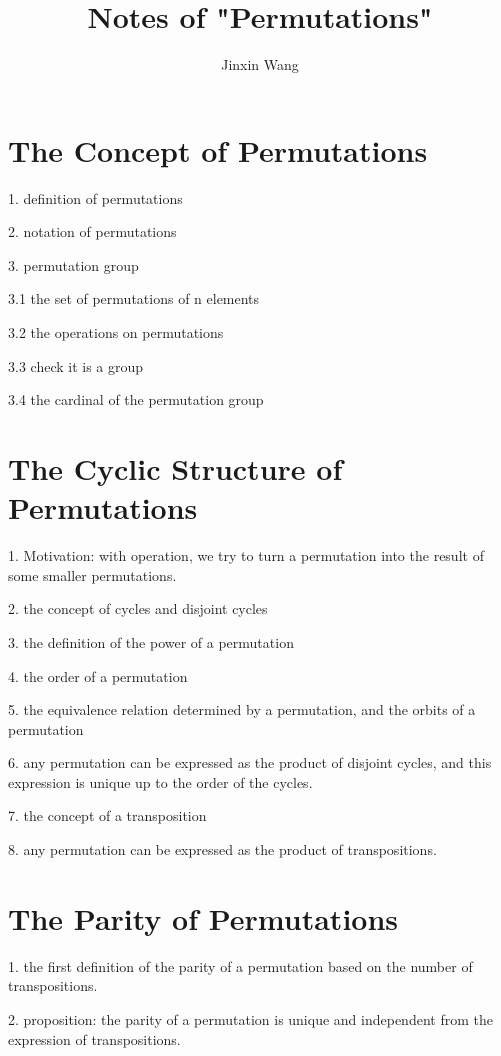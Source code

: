 \documentclass[onecolumn]{ctexart}
\title{Notes of "Permutations"}
\author{Jinxin Wang}
\date{}
\begin{document}
\maketitle

\section{The Concept of Permutations}

1. definition of permutations

2. notation of permutations

3. permutation group

3.1 the set of permutations of n elements

3.2 the operations on permutations

3.3 check it is a group

3.4 the cardinal of the permutation group

\section{The Cyclic Structure of Permutations}

1. Motivation: with operation, we try to turn a permutation into the result of 
some smaller permutations.

2. the concept of cycles and disjoint cycles

3. the definition of the power of a permutation

4. the order of a permutation

5. the equivalence relation determined by a permutation, and the orbits of a 
permutation

6. any permutation can be expressed as the product of disjoint cycles, and this 
expression is unique up to the order of the cycles.

7. the concept of a transposition

8. any permutation can be expressed as the product of transpositions.

\section{The Parity of Permutations}

1. the first definition of the parity of a permutation based on the number of 
transpositions.

2. proposition: the parity of a permutation is unique and independent from the 
expression of transpositions.
\end{document}
